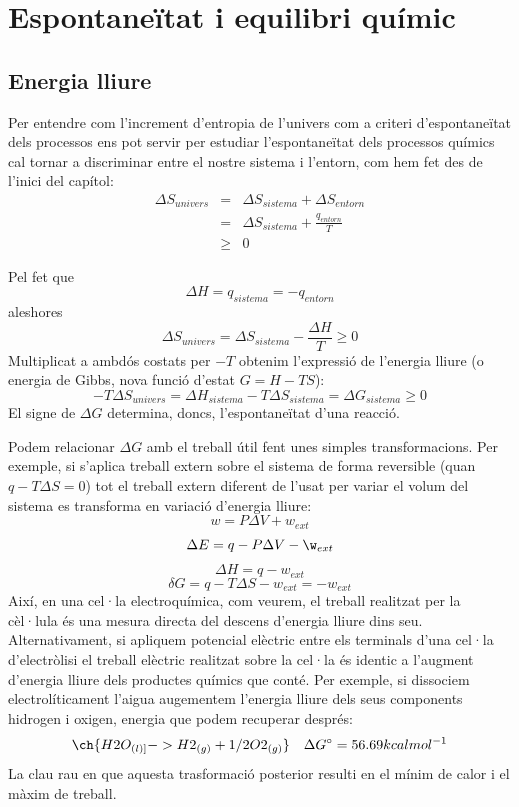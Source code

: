 \section{Espontaneïtat i equilibri químic}

\subsection{Energia lliure}

Per entendre com l'increment d'entropia de l'univers com a criteri d'espontaneïtat dels processos ens pot servir per estudiar l'espontaneïtat dels processos químics cal tornar a discriminar entre el nostre sistema i l'entorn, com hem fet des de l'inici del capítol:
\begin{eqnarray*}
\Delta S_{univers} &= &\Delta S_{sistema} + \Delta S_{entorn}\\
&=&\Delta S_{sistema} + \frac{q_{entorn}}{T}\\
&\geq & 0
\end{eqnarray*}

Pel fet que
\[
\Delta H= q_{sistema} = -q_{entorn}
\]
aleshores
\[
\Delta S_{univers} = \Delta S_{sistema} - \frac{\Delta H}{T} \geq 0
\]
Multiplicat a ambdós costats per $-T$ obtenim l'expressió de l'energia lliure (o energia de Gibbs, nova funció d'estat $G=H-TS$):
\begin{equation}
-T \Delta S_{univers} = \Delta H_{sistema} -T\Delta S_{sistema}= \Delta G_{sistema} \geq 0
\label{Eq:Gibbs}
\end{equation}
El signe de $\Delta G$ determina, doncs, l'espontaneïtat d'una reacció.

Podem relacionar $\Delta G$ amb el treball útil fent unes simples transformacions. Per exemple, si s'aplica treball extern sobre el sistema de forma reversible (quan $q-T\Delta S=0$) tot el treball extern diferent de l'usat per variar el volum del sistema es transforma en variació d'energia lliure:
\[w=P\Delta V + w_{ext}\]
\[\Delta E = q-P\Delta V -\w_{ext}\]
\[\Delta H= q-w_{ext}\]
\[\delta G = q - T\Delta S -w_{ext} = -w_{ext}\]
Així, en una cel·la electroquímica, com veurem, el treball realitzat per la cèl·lula és una mesura directa del descens 
d'energia lliure dins seu. Alternativament, si apliquem potencial elèctric entre els terminals d'una cel·la d'electròlisi el treball elèctric realitzat sobre la cel·la és identic a l'augment d'energia lliure dels productes químics que conté. Per exemple, si dissociem electrolíticament l'aigua augementem l'energia lliure dels seus components hidrogen i oxigen, energia que podem recuperar després:
\[\ch{H2O_{(l)]} -> H2_{(g)} + 1/2 O2_{(g)}} \quad \Delta G^{\circ}= 56.69 kcal mol^{-1}\]
La clau rau en que aquesta trasformació posterior resulti en el mínim de calor i el màxim de treball.

